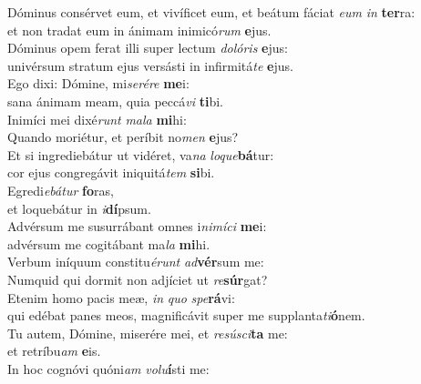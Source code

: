 \evenverse Dóminus consérvet eum, et vivíficet eum, et beátum fáciat \textit{e}\textit{um} \textit{in} \textbf{ter}ra:~\*\\
\evenverse et non tradat eum in ánimam inimicó\textit{rum} \textbf{e}jus.\\
\oddverse Dóminus opem ferat illi super lectum \textit{do}\textit{ló}\textit{ris} \textbf{e}jus:~\*\\
\oddverse univérsum stratum ejus versásti in infirmitá\textit{te} \textbf{e}jus.\\
\evenverse Ego dixi: Dómine, mi\textit{se}\textit{ré}\textit{re} \textbf{me}i:~\*\\
\evenverse sana ánimam meam, quia peccá\textit{vi} \textbf{ti}bi.\\
\oddverse Inimíci mei dixé\textit{runt} \textit{ma}\textit{la} \textbf{mi}hi:~\*\\
\oddverse Quando moriétur, et períbit no\textit{men} \textbf{e}jus?\\
\evenverse Et si ingrediebátur ut vidéret, va\textit{na} \textit{lo}\textit{que}\textbf{bá}tur:~\*\\
\evenverse cor ejus congregávit iniquitá\textit{tem} \textbf{si}bi.\\
\oddverse Egredi\textit{e}\textit{bá}\textit{tur} \textbf{fo}ras,~\*\\
\oddverse et loquebátur in \textit{i}\textbf{dí}psum.\\
\evenverse Advérsum me susurrábant omnes i\textit{ni}\textit{mí}\textit{ci} \textbf{me}i:~\*\\
\evenverse advérsum me cogitábant ma\textit{la} \textbf{mi}hi.\\
\oddverse Verbum iníquum constitu\textit{é}\textit{runt} \textit{ad}\textbf{vér}sum me:~\*\\
\oddverse Numquid qui dormit non adjíciet ut \textit{re}\textbf{súr}gat?\\
\evenverse Etenim homo pacis meæ, \textit{in} \textit{quo} \textit{spe}\textbf{rá}vi:~\*\\
\evenverse qui edébat panes meos, magnificávit super me supplanta\textit{ti}\textbf{ó}nem.\\
\oddverse Tu autem, Dómine, miserére mei, et \textit{re}\textit{sú}\textit{sci}\textbf{ta} me:~\*\\
\oddverse et retríbu\textit{am} \textbf{e}is.\\
\evenverse In hoc cognóvi quóni\textit{am} \textit{vo}\textit{lu}\textbf{í}sti me:~\*\\
